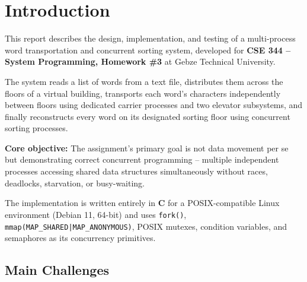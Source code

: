 \documentclass[12pt,a4paper]{article}
\newcommand{\code}[1]{\texttt{\small #1}}
\begin{document}
\pagecolor{white}
\color{black}
\setcounter{page}{1}

\tableofcontents
\newpage

\section{Introduction}

This report describes the design, implementation, and testing of a multi-process
word transportation and concurrent sorting system, developed for \textbf{CSE 344 --
System Programming, Homework \#3} at Gebze Technical University.

The system reads a list of words from a text file, distributes them across the
floors of a virtual building, transports each word's characters independently
between floors using dedicated carrier processes and two elevator subsystems, and
finally reconstructs every word on its designated sorting floor using concurrent
sorting processes.

\begin{infobox}
\textbf{Core objective:} The assignment's primary goal is not data movement per se
but demonstrating correct concurrent programming -- multiple independent processes
accessing shared data structures simultaneously without races, deadlocks,
starvation, or busy-waiting.
\end{infobox}

The implementation is written entirely in \textbf{C} for a POSIX-compatible Linux
environment (Debian 11, 64-bit) and uses \code{fork()},
\code{mmap(MAP\_SHARED|MAP\_ANONYMOUS)}, POSIX mutexes, condition variables, and
semaphores as its concurrency primitives.

\subsection{Main Challenges}
\end{document}
